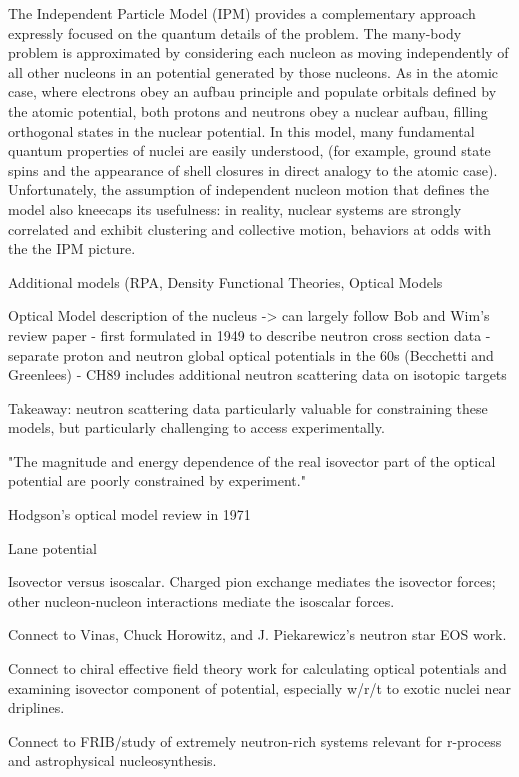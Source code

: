 The Independent Particle Model (IPM) provides a complementary approach expressly
focused on the quantum details of the problem. The many-body problem is
approximated by considering each nucleon as moving independently of all other
nucleons in an potential generated by those nucleons. As in the atomic case,
where electrons obey an aufbau principle and populate orbitals defined by the
atomic potential, both protons and neutrons obey a nuclear aufbau, filling
orthogonal states in the nuclear potential. In this model, many fundamental
quantum properties of nuclei are easily understood, (for example, ground state spins and
the appearance of shell closures in direct analogy to the atomic case).
Unfortunately, the assumption of independent nucleon motion that defines the model
also kneecaps its usefulness: in reality, nuclear systems are strongly
correlated and exhibit clustering and collective motion, behaviors at odds with the
the IPM picture.

Additional models (RPA, Density Functional Theories, Optical Models

Optical Model description of the nucleus
-> can largely follow Bob and Wim's review paper
- first formulated in 1949 to describe neutron cross section data
- separate proton and neutron global optical potentials in the 60s (Becchetti
and Greenlees)
- CH89 includes additional neutron scattering data on isotopic targets

Takeaway: neutron scattering data particularly valuable for constraining these
models, but particularly challenging to access experimentally.

"The magnitude and energy dependence of the real isovector part of the
optical potential are poorly constrained by experiment." \cite{Holt16}

Hodgson's optical model review in 1971

Lane potential 

Isovector versus isoscalar. Charged pion exchange mediates the isovector forces;
other nucleon-nucleon interactions mediate the isoscalar forces.

Connect to Vinas, Chuck Horowitz, and J. Piekarewicz's neutron star EOS work.

Connect to chiral effective field theory work for calculating optical potentials
and examining isovector component of potential, especially w/r/t to exotic
nuclei near driplines.

Connect to FRIB/study of extremely neutron-rich systems relevant for r-process
and astrophysical nucleosynthesis.

